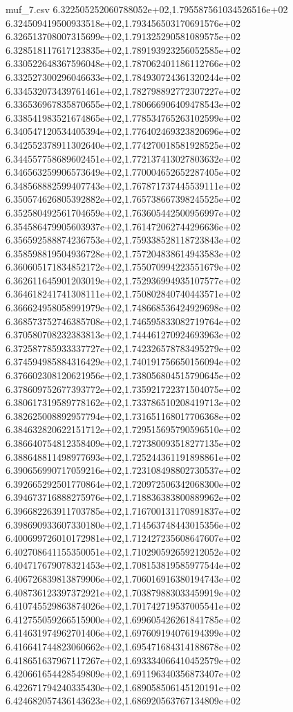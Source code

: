 \begin{filecontents*}{muf_7.csv}
6.322505252060788052e+02,1.795587561034526516e+02
6.324509419500933518e+02,1.793456503170691576e+02
6.326513708007315699e+02,1.791325290581089575e+02
6.328518117617123835e+02,1.789193923256052585e+02
6.330522648367596048e+02,1.787062401186112766e+02
6.332527300296046633e+02,1.784930724361320244e+02
6.334532073439761461e+02,1.782798892772307227e+02
6.336536967835870655e+02,1.780666906409478543e+02
6.338541983521674865e+02,1.778534765263102599e+02
6.340547120534405394e+02,1.776402469323820696e+02
6.342552378911302640e+02,1.774270018581928525e+02
6.344557758689602451e+02,1.772137413027803632e+02
6.346563259906573649e+02,1.770004652652287405e+02
6.348568882599407743e+02,1.767871737445539111e+02
6.350574626805392882e+02,1.765738667398245525e+02
6.352580492561704659e+02,1.763605442500956997e+02
6.354586479905603937e+02,1.761472062744296636e+02
6.356592588874236753e+02,1.759338528118723843e+02
6.358598819504936728e+02,1.757204838614943583e+02
6.360605171834852172e+02,1.755070994223551679e+02
6.362611645901203019e+02,1.752936994935107577e+02
6.364618241741308111e+02,1.750802840740443571e+02
6.366624958058991979e+02,1.748668536424929698e+02
6.368573752746385708e+02,1.746595833082719764e+02
6.370580708232383813e+02,1.744461270924693963e+02
6.372587785933337727e+02,1.742326578783495279e+02
6.374594985884316429e+02,1.740191756650156094e+02
6.376602308120621956e+02,1.738056804515790645e+02
6.378609752677393772e+02,1.735921722371504075e+02
6.380617319589778162e+02,1.733786510208419713e+02
6.382625008892957794e+02,1.731651168017706368e+02
6.384632820622151712e+02,1.729515695790596510e+02
6.386640754812358409e+02,1.727380093518277135e+02
6.388648811498977693e+02,1.725244361191898861e+02
6.390656990717059216e+02,1.723108498802730537e+02
6.392665292501770864e+02,1.720972506342068300e+02
6.394673716888275976e+02,1.718836383800889962e+02
6.396682263911703785e+02,1.716700131170891837e+02
6.398690933607330180e+02,1.714563748443015356e+02
6.400699726010172981e+02,1.712427235608647607e+02
6.402708641155350051e+02,1.710290592659212052e+02
6.404717679078321453e+02,1.708153819585977544e+02
6.406726839813879906e+02,1.706016916380194743e+02
6.408736123397372921e+02,1.703879883033459919e+02
6.410745529863874026e+02,1.701742719537005541e+02
6.412755059266515900e+02,1.699605426261841785e+02
6.414631974962701406e+02,1.697609194076194399e+02
6.416641744823060662e+02,1.695471684314188678e+02
6.418651637967117267e+02,1.693334066410452579e+02
6.420661654428549809e+02,1.691196340356873407e+02
6.422671794240335430e+02,1.689058506145120191e+02
6.424682057436143623e+02,1.686920563767134809e+02

\end{filecontents*}

